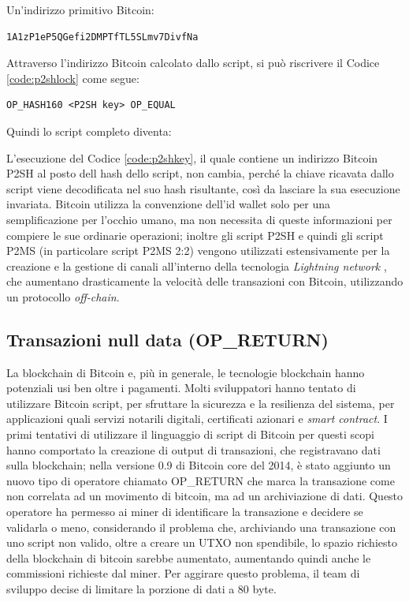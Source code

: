 Un'indirizzo primitivo Bitcoin:

\begin{lstlisting}[language=bitcoinscript, caption={Indirizzo Bitcoin primitivo.}]
1A1zP1eP5QGefi2DMPTfTL5SLmv7DivfNa
\end{lstlisting}

Attraverso l’indirizzo Bitcoin calcolato dallo script, si può riscrivere il Codice \ref{code:p2shlock} come segue:
\begin{lstlisting}[language=bitcoinscript, label={code:p2shlockwithkey}, caption={Script P2SH di blocco con Indirizzo Bitcoin P2SH.}]
OP_HASH160 <P2SH key> OP_EQUAL
\end{lstlisting}

Quindi lo script completo diventa:



L’esecuzione del Codice \ref{code:p2shkey}, il quale contiene un indirizzo Bitcoin P2SH al posto dell hash dello script, non cambia, perché la chiave ricavata dallo script viene decodificata nel suo hash risultante, così da lasciare la sua esecuzione invariata.
Bitcoin utilizza la convenzione dell'id wallet solo per una semplificazione per l'occhio umano, ma non necessita di queste informazioni per compiere le sue ordinarie operazioni; inoltre gli script P2SH e quindi gli script P2MS (in particolare script P2MS 2:2) vengono utilizzati estensivamente per la creazione e la gestione di canali all’interno della tecnologia {\it Lightning network \/}, che aumentano drasticamente la velocità delle transazioni con Bitcoin, utilizzando un protocollo {\it off-chain\/}.

\subsection{Transazioni null data (OP\_RETURN)}
La blockchain di Bitcoin e, più in generale, le tecnologie blockchain hanno potenziali usi ben oltre i pagamenti. Molti sviluppatori hanno tentato di utilizzare Bitcoin script, per sfruttare la sicurezza e la resilienza del sistema, per applicazioni quali servizi notarili digitali, certificati azionari e {\it smart contract\/}. I primi tentativi di utilizzare il linguaggio di script di Bitcoin per questi scopi hanno comportato la creazione di output di transazioni, che registravano dati sulla blockchain; nella versione 0.9 di Bitcoin core del 2014, è stato aggiunto un nuovo tipo di operatore chiamato OP\_RETURN che marca la transazione come non correlata ad un movimento di bitcoin, ma ad un archiviazione di dati. Questo operatore ha permesso ai miner di identificare la transazione e decidere se validarla o meno, considerando il problema che, archiviando una transazione con uno script non valido, oltre a creare un UTXO non spendibile, lo spazio richiesto della blockchain di bitcoin sarebbe aumentato, aumentando quindi anche le commissioni richieste dal miner.
Per aggirare questo problema, il team di sviluppo decise di limitare la porzione di dati a 80 byte.

